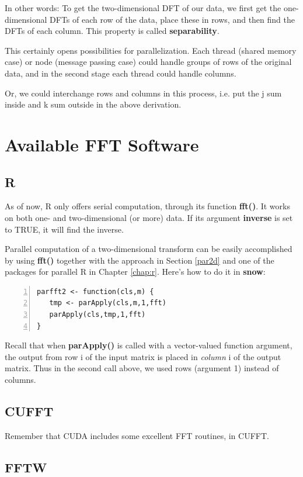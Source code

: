 In other words:  To get the two-dimensional DFT of our data, we first get
the one-dimensional DFTs of each row of the data, place these in rows,
and then find the DFTs of each column.  This property is called {\bf
separability}.

This certainly opens possibilities for parallelization.  Each thread
(shared memory case) or node (message passing case) could handle groups
of rows of the original data, and in the second stage each thread could
handle columns.

Or, we could interchange rows and columns in this process, i.e. put the
j sum inside and k sum outside in the above derivation.

\section{Available FFT Software}

\subsection{R}
\label{rfft}

As of now, R only offers serial computation, through its function {\bf
fft()}.  It works on both one- and two-dimensional (or more) data.  If
its argument {\bf inverse} is set to TRUE, it will find the inverse.

Parallel computation of a two-dimensional transform can be easily
accomplished by using {\bf fft()} together with the approach in Section
\ref{par2d} and one of the packages for parallel R in Chapter
\ref{chap:r}.  Here's how to do it in {\bf snow}:

\begin{lstlisting}[numbers=left]
parfft2 <- function(cls,m) {
   tmp <- parApply(cls,m,1,fft)
   parApply(cls,tmp,1,fft)
}
\end{lstlisting}

Recall that when {\bf parApply()} is called with a vector-valued
function argument, the output from row i of the input matrix is placed
in {\it column} i of the output matrix.  Thus in the second call above,
we used rows (argument 1) instead of columns.

\subsection{CUFFT}

Remember that CUDA includes some excellent FFT routines, in CUFFT.

\subsection{FFTW}

